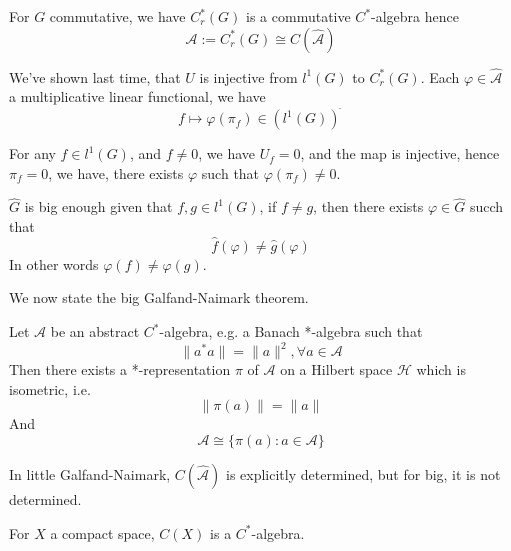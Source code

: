 For $G$ commutative, we have $C_r^*(G)$ is a commutative $C^*$-algebra hence
\begin{equation*}
    \mathcal{A}:=C_r^*(G)\cong C(\widehat{\mathcal{A}})
\end{equation*}

We've shown last time, that $U$ is injective from $l^1(G)$ to $C_r^*(G)$. Each $\varphi\in\widehat{\mathcal{A}}$ a multiplicative linear functional, we have
\begin{equation*}
    f\mapsto \varphi(\pi_f)\in(l^1(G))^{\widehat{\phantom{.}}}
\end{equation*}

For any $f\in l^1(G)$, and $f\neq 0$, we have $U_f=0$, and the map is injective, hence $\pi_f=0$, we have, there exists $\varphi$ such that $\varphi(\pi_f)\neq 0$.

\begin{corollary}
    $\widehat{G}$ is big enough given that $f,g\in l^1(G)$, if $f\neq g$, then there exists $\varphi\in\widehat{G}$ succh that 
    \begin{equation*}
        \widehat{f}(\varphi)\neq\widehat{g}(\varphi)
    \end{equation*}
    In other words $\varphi(f)\neq\varphi(g)$.
\end{corollary}

We now state the big Galfand-Naimark theorem.
\begin{theorem}
    Let $\mathcal{A}$ be an abstract $C^*$-algebra, e.g. a Banach *-algebra such that 
    \begin{equation*}
        \|a^*a\|=\|a\|^2, \forall a\in\mathcal{A}
    \end{equation*}
    Then there exists a *-representation $\pi$ of $\mathcal{A}$ on a Hilbert space $\mathcal{H}$ which is isometric, i.e.
    \begin{equation*}
        \|\pi(a)\|=\|a\|
    \end{equation*}
    And
    \begin{equation*}
        \mathcal{A}\cong \{\pi(a): a\in\mathcal{A}\}
    \end{equation*}
\end{theorem}
\begin{note}
    In little Galfand-Naimark, $C(\widehat{\mathcal{A}})$ is explicitly determined, but for big, it is not determined.
\end{note}

For $X$ a compact space, $C(X)$ is a $C^*$-algebra.

